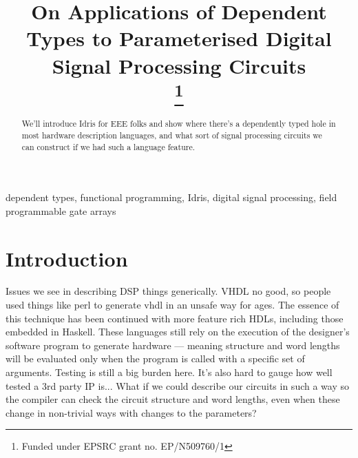 \documentclass[conference]{IEEEtran}
\begin{document}
\title{On Applications of Dependent Types to Parameterised Digital Signal
  Processing Circuits \\
\thanks{Funded under EPSRC grant no. EP/N509760/1} }

\author{
\and
{}
\and
{}
}

\maketitle

\begin{abstract}
  We'll introduce Idris for EEE folks and show where there's a dependently typed
  hole in most hardware description languages, and what sort of signal
  processing circuits we can construct if we had such a language feature.
\end{abstract}

\begin{IEEEkeywords}
dependent types, functional programming, Idris, digital signal processing, field programmable gate arrays  
\end{IEEEkeywords}

\section{Introduction}

Issues we see in describing DSP things generically. VHDL no good, so people used
things like perl to generate vhdl in an unsafe way for ages. The essence of this
technique has been continued with more feature rich HDLs, including those
embedded in Haskell. These languages still rely on the execution of the
designer's software program to generate hardware --- meaning structure and
word lengths will be evaluated only when the program is called with a specific
set of arguments. Testing is still a big burden here. It's also hard to gauge
how well tested a 3rd party IP is... What if we could describe our circuits in
such a way so the compiler can check the circuit structure and word lengths, even
when these change in non-trivial ways with changes to the parameters?
\end{document}
